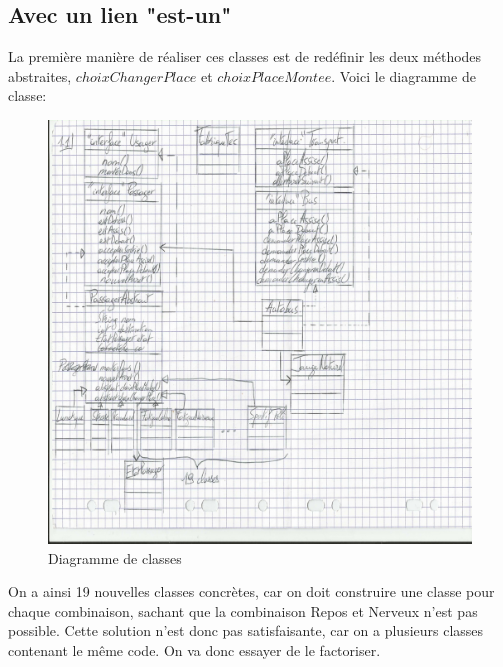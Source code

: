 \documentclass[a4paper,11pt]{article}
\begin{document}
\subsection{Avec un lien "est-un"}
La première manière de réaliser ces classes est de redéfinir les deux méthodes abstraites, $choixChangerPlace$ et $choixPlaceMontee$.
Voici le diagramme de classe:
\newpage
\begin{figure}[!h]
  \begin{center}
    \caption{Diagramme de classes}
    \includegraphics[scale=0.1]{Diag1.jpg}
  \end{center}
\end{figure}
On a ainsi 19 nouvelles classes concrètes, car on doit construire une classe pour chaque combinaison, sachant que la combinaison Repos et Nerveux n'est pas possible. Cette solution n'est donc pas satisfaisante, car on a plusieurs classes contenant le même code. On va donc essayer de le factoriser.
\end{document}

